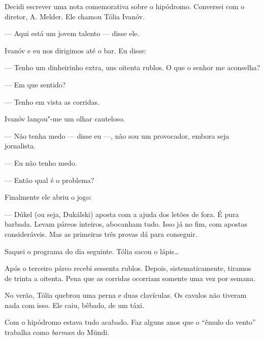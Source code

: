 Decidi escrever uma nota comemorativa sobre o hipódromo. Conversei com o
diretor, A. Melder. Ele chamou Tólia Ivanóv.

--- Aqui está um jovem talento --- disse ele.

Ivanóv e eu nos dirigimos até o bar. Eu disse:

--- Tenho um dinheirinho extra, uns oitenta rublos. O que o senhor me
aconselha?

--- Em que sentido?

--- Tenho em vista as corridas.

Ivanóv lançou"-me um olhar cauteloso.

--- Não tenha medo --- disse eu ---, não sou um provocador, embora seja
jornalista.

--- Eu não tenho medo.

--- Então qual é o problema?

Finalmente ele abriu o jogo:

--- Dúkel (ou seja, Dukálski) aposta com a ajuda dos letões de fora. É
pura barbada. Levam páreos inteiros, abocanham tudo. Isso já no fim, com
apostas consideráveis. Mas as primeiras três provas dá para conseguir.

Saquei o programa do dia seguinte. Tólia sacou o lápis\ldots{}

Após o terceiro páreo recebi sessenta rublos. Depois, sistematicamente,
tiramos de trinta a oitenta. Pena que as corridas ocorriam somente uma
vez por semana.

No verão, Tólia quebrou uma perna e duas clavículas. Os cavalos não
tiveram nada com isso. Ele caiu, bêbado, de um táxi.

Com o hipódromo estava tudo acabado. Faz alguns anos que o ``êmulo do
vento'' trabalha como \emph{barman} do Mündi.

\clearpage
\thispagestyle{empty}

\movetooddpage
\begin{center}
{}
\end{center}

